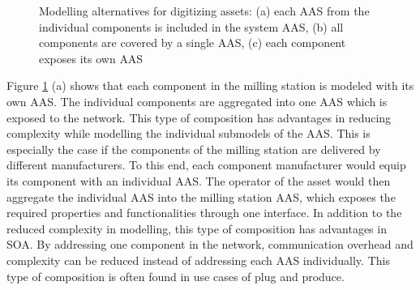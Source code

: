 \begin{figure}[h]
\centering
{}
\caption{Modelling alternatives for digitizing assets: (a) each \ac{AAS} from the individual components is included in the system \ac{AAS}, (b) all components are covered by a single \ac{AAS}, (c) each component exposes its own \ac{AAS}}
\label{fig:aas-modeling-alternatives}
\end{figure}

Figure \ref{fig:aas-modeling-alternatives} (a) shows that each component in the milling station is modeled with its own \ac{AAS}. The individual components are aggregated into one \ac{AAS} which is exposed to the network. This type of composition has advantages in reducing complexity while modelling the individual submodels of the \ac{AAS}. This is especially the case if the components of the milling station are delivered by different manufacturers. To this end, each component manufacturer would equip its component with an individual \ac{AAS}. The operator of the asset would then aggregate the individual \ac{AAS} into the milling station \ac{AAS}, which exposes the required properties and functionalities through one interface. In addition to the reduced complexity in modelling, this type of composition has advantages in \ac{SOA}. By addressing one component in the network, communication overhead and complexity can be reduced instead of addressing each \ac{AAS} individually. This type of composition is often found in use cases of plug and produce.

